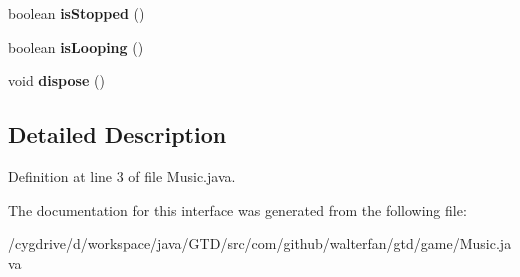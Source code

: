 \begin{DoxyCompactItemize}
\item 
\hypertarget{interfacecom_1_1github_1_1walterfan_1_1gtd_1_1game_1_1Music_a0902b1c673ed8dd92a0bb33140846934}{boolean {\bfseries is\-Stopped} ()}\label{interfacecom_1_1github_1_1walterfan_1_1gtd_1_1game_1_1Music_a0902b1c673ed8dd92a0bb33140846934}

\item 
\hypertarget{interfacecom_1_1github_1_1walterfan_1_1gtd_1_1game_1_1Music_a6bc86c2baea1ec14e96c972983dcb87c}{boolean {\bfseries is\-Looping} ()}\label{interfacecom_1_1github_1_1walterfan_1_1gtd_1_1game_1_1Music_a6bc86c2baea1ec14e96c972983dcb87c}

\item 
\hypertarget{interfacecom_1_1github_1_1walterfan_1_1gtd_1_1game_1_1Music_a54fc265074514024a39823c3038dac87}{void {\bfseries dispose} ()}\label{interfacecom_1_1github_1_1walterfan_1_1gtd_1_1game_1_1Music_a54fc265074514024a39823c3038dac87}

\end{DoxyCompactItemize}


\subsection{Detailed Description}


Definition at line 3 of file Music.\-java.



The documentation for this interface was generated from the following file\-:\begin{DoxyCompactItemize}
\item 
/cygdrive/d/workspace/java/\-G\-T\-D/src/com/github/walterfan/gtd/game/Music.\-java\end{DoxyCompactItemize}
